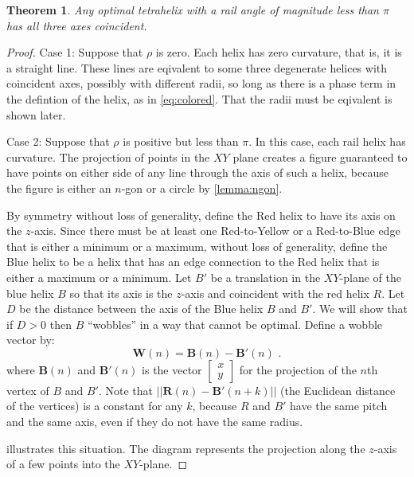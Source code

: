 \documentclass[10pt,final]{journals-1.0/asme2ej}
\newtheorem{theorem}{Theorem}
\renewcommand{\vec}[1]{\mathbf{#1}}
\begin{document}
\begin{theorem}
  Any optimal tetrahelix with a rail angle of magnitude less than $\pi$ has all three
  axes coincident.
  \label{thm:coincident}
\end{theorem}
\begin{proof}
  Case 1: Suppose that $\rho$ is zero.
  Each helix has zero curvature, that is, it is a straight line. These lines are eqivalent
  to some three degenerate helices with coincident axes, possibly with different radii,
  so long as there is a phase
  term in the defintion of the helix, as in \cref{eq:colored}. That the
  radii must be eqivalent is shown later.
    
  Case 2: Suppose that $\rho$ is positive but less than $\pi$.
  In this case, each rail helix has
  curvature. The projection of points in the $XY$ plane creates a figure
  guaranteed to have points on either side of any line through the axis of such
  a helix, because the figure is either an $n$-gon or a circle by \cref{lemma:ngon}.

  By symmetry without loss of generality, define the Red helix to have its axis on the $z$-axis.
  Since there must be at least one Red-to-Yellow or a Red-to-Blue edge that is either a minimum or a maximum,
  without loss of generality, define the Blue helix to be a helix that
  has an edge connection to the Red helix that is either a maximum or a minimum.
  Let $B'$ be a translation in the $XY$-plane of the blue helix $B$  so that its axis is the $z$-axis and
  coincident with the red helix $R$. Let $D$ be the distance between the axis of the Blue helix
  $B$ and $B'$. We will show that if $D>0$ then $B$ ``wobbles'' in a way that cannot be optimal.
  Define a wobble vector by:
  \begin{equation}
    \vec{W}(n) = \vec{B}(n) - \vec{B}'(n) \text{ .}
  \end{equation}
  where $\vec{B}(n)$ and $\vec{B'}(n)$ is the vector
  $\begin{bmatrix}
    x \\
    y 
  \end{bmatrix}$
  for the projection of the $n$th vertex of $B$ and $B'$. 
  Note that $|| \vec{R}(n) - \vec{B'}(n+k)||$ (the Euclidean distance of the vertices)
  is a constant for any $k$, because $R$ and $B'$ have the
  same pitch and the same axis, even if they do not have the same radius.

   illustrates this situation.
  The diagram represents the projection along the
  $z$-axis of a few points into the $XY$-plane.


\end{proof}
\end{document}
